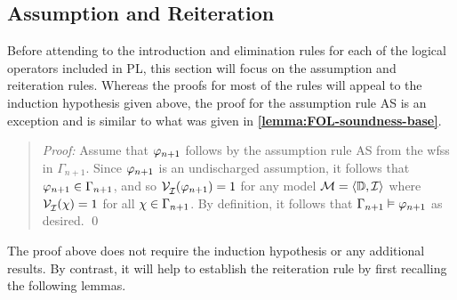 \subsection{Assumption and Reiteration}%
  \label{sub:AssumptionRule}

Before attending to the introduction and elimination rules for each of the logical operators included in PL, this section will focus on the assumption and reiteration rules.
Whereas the proofs for most of the rules will appeal to the induction hypothesis given above, the proof for the assumption rule AS is an exception and is similar to what was given in \textbf{\ref{lemma:FOL-soundness-base}}. 


\begin{quote} 
  \textit{Proof:} Assume that $\varphi_{n+1}$ follows by the assumption rule AS from the wfss in $\Gamma_{n+1}$.
  Since $\varphi_{n+1}$ is an undischarged assumption, it follows that $\varphi_{n+1}\in\Gamma_{n+1}$, and so $\mathcal{V}_{\mathcal{I}}^{}(\varphi_{n+1}) = 1$ for any model $\mathcal{M} = \langle\mathbb{D}, \mathcal{I}\rangle$ where $\mathcal{V}_{\mathcal{I}}^{}(\chi) = 1$ for all $\chi \in \Gamma_{n+1}$. 
  By definition, it follows that $\Gamma_{n+1} \vDash \varphi_{n+1}$ as desired.
  \qed
\end{quote}

The proof above does not require the induction hypothesis or any additional results.
By contrast, it will help to establish the reiteration rule by first recalling the following lemmas.

%

